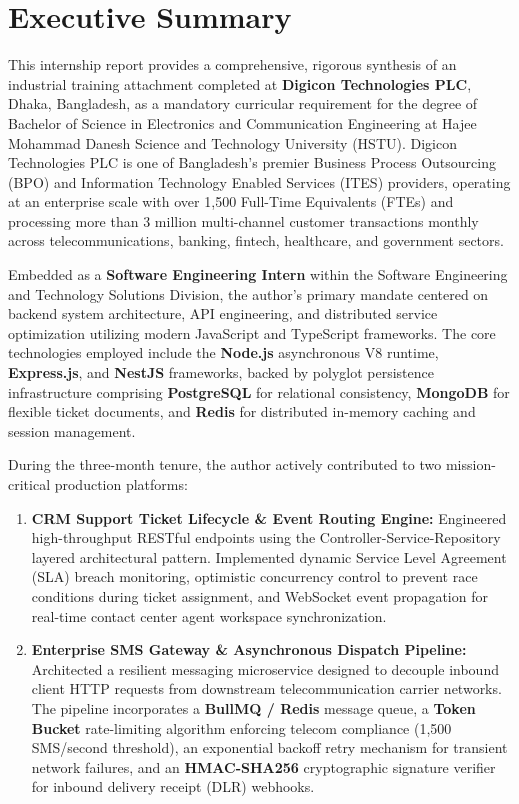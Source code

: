 \chapter*{Executive Summary}

\vspace{0.4cm}
This internship report provides a comprehensive, rigorous synthesis of an industrial training attachment completed at \textbf{Digicon Technologies PLC}, Dhaka, Bangladesh, as a mandatory curricular requirement for the degree of Bachelor of Science in Electronics and Communication Engineering at Hajee Mohammad Danesh Science and Technology University (HSTU). Digicon Technologies PLC is one of Bangladesh's premier Business Process Outsourcing (BPO) and Information Technology Enabled Services (ITES) providers, operating at an enterprise scale with over 1,500 Full-Time Equivalents (FTEs) and processing more than 3 million multi-channel customer transactions monthly across telecommunications, banking, fintech, healthcare, and government sectors.

Embedded as a \textbf{Software Engineering Intern} within the Software Engineering and Technology Solutions Division, the author's primary mandate centered on backend system architecture, API engineering, and distributed service optimization utilizing modern JavaScript and TypeScript frameworks. The core technologies employed include the \textbf{Node.js} asynchronous V8 runtime, \textbf{Express.js}, and \textbf{NestJS} frameworks, backed by polyglot persistence infrastructure comprising \textbf{PostgreSQL} for relational consistency, \textbf{MongoDB} for flexible ticket documents, and \textbf{Redis} for distributed in-memory caching and session management.

During the three-month tenure, the author actively contributed to two mission-critical production platforms:
\begin{enumerate}
    \item \textbf{CRM Support Ticket Lifecycle \& Event Routing Engine:} Engineered high-throughput RESTful endpoints using the Controller-Service-Repository layered architectural pattern. Implemented dynamic Service Level Agreement (SLA) breach monitoring, optimistic concurrency control to prevent race conditions during ticket assignment, and WebSocket event propagation for real-time contact center agent workspace synchronization.
    \item \textbf{Enterprise SMS Gateway \& Asynchronous Dispatch Pipeline:} Architected a resilient messaging microservice designed to decouple inbound client HTTP requests from downstream telecommunication carrier networks. The pipeline incorporates a \textbf{BullMQ / Redis} message queue, a \textbf{Token Bucket} rate-limiting algorithm enforcing telecom compliance (1,500 SMS/second threshold), an exponential backoff retry mechanism for transient network failures, and an \textbf{HMAC-SHA256} cryptographic signature verifier for inbound delivery receipt (DLR) webhooks.
\end{enumerate}

